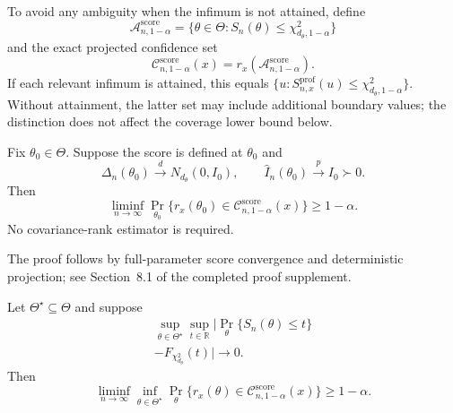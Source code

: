 To avoid any ambiguity when the infimum is not attained, define
\begin{equation}\label{eq:sec8-score-acceptance}
\mathcal A_{n,1-\alpha}^{\mathrm{score}}
=\{\theta\in\Theta:S_n(\theta)\le\chi^2_{d_\theta,1-\alpha}\}
\end{equation}
and the exact projected confidence set
\begin{equation}\label{eq:sec8-score-ci}
\mathcal C_{n,1-\alpha}^{\mathrm{score}}(x)
=r_x(\mathcal A_{n,1-\alpha}^{\mathrm{score}}).
\end{equation}
If each relevant infimum is attained, this equals
$\{u:S_{n,x}^{\mathrm{prof}}(u)\le\chi^2_{d_\theta,1-\alpha}\}$.
Without attainment, the latter set may include additional boundary
values; the distinction does not affect the coverage lower bound below.

\begin{proposition}
\label{prop:sec8-rankfree}
Fix $\theta_0\in\Theta$. Suppose the score is defined at $\theta_0$
and
\[
\Delta_n(\theta_0)\xrightarrow{d}N_{d_\theta}(0,I_0),
\qquad
\widehat I_n(\theta_0)\xrightarrow{p}I_0\succ0.
\]
Then
\begin{equation}\label{eq:sec8-score-pointwise-coverage}
\liminf_{n\to\infty}\Pr_{\theta_0}
\{r_x(\theta_0)\in
\mathcal C_{n,1-\alpha}^{\mathrm{score}}(x)\}
\ge1-\alpha.
\end{equation}
No covariance-rank estimator is required.
\end{proposition}

The proof follows by full-parameter score convergence and deterministic projection; see Section~8.1 of the completed proof supplement.


\begin{proposition}
\label{prop:sec8-rankfree-uniform}
Let $\Theta^\star\subseteq\Theta$ and suppose
\begin{equation}\label{eq:sec8-uniform-score-approx}
\begin{aligned}
\sup_{\theta\in\Theta^\star}\sup_{t\in\mathbb R}
\big|\Pr_\theta\{S_n(\theta)\le t\}\\
-F_{\chi_{d_\theta}^2}(t)\big|\longrightarrow0.
\end{aligned}
\end{equation}
Then
\begin{equation}\label{eq:sec8-uniform-score-coverage}
\liminf_{n\to\infty}\inf_{\theta\in\Theta^\star}
\Pr_\theta\{r_x(\theta)\in
\mathcal C_{n,1-\alpha}^{\mathrm{score}}(x)\}
\ge1-\alpha.
\end{equation}
\end{proposition}

